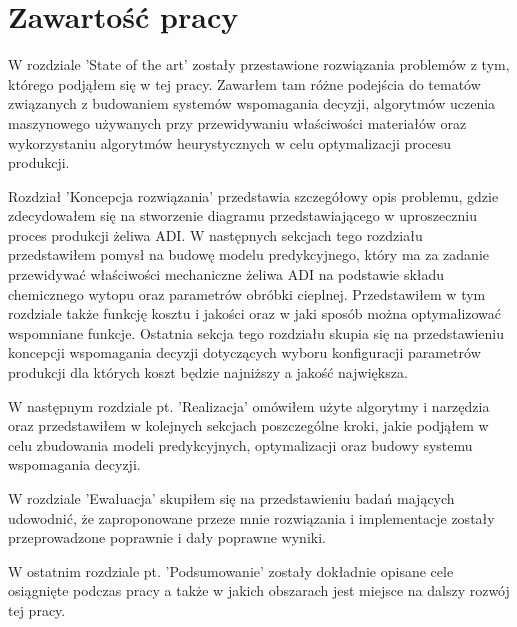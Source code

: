 \section{Zawartość pracy}
W rozdziale 'State of the art' zostały przestawione rozwiązania problemów z tym, którego podjąłem się w tej pracy. Zawarłem tam różne podejścia do tematów związanych z budowaniem systemów wspomagania decyzji, algorytmów uczenia maszynowego używanych przy przewidywaniu właściwości materiałów oraz wykorzystaniu algorytmów heurystycznych w celu optymalizacji procesu produkcji.

Rozdział 'Koncepcja rozwiązania' przedstawia szczegółowy opis problemu, gdzie zdecydowałem się na stworzenie diagramu przedstawiającego w uproszeczniu proces produkcji żeliwa ADI. W następnych sekcjach tego rozdziału przedstawiłem pomysł na budowę modelu predykcyjnego, który ma za zadanie przewidywać właściwości mechaniczne żeliwa ADI na podstawie składu chemicznego wytopu oraz parametrów obróbki cieplnej. Przedstawiłem w tym rozdziale także funkcję kosztu i jakości oraz w jaki sposób można optymalizować wspomniane funkcje. Ostatnia sekcja tego rozdziału skupia się na przedstawieniu koncepcji wspomagania decyzji dotyczących wyboru konfiguracji parametrów produkcji dla których koszt będzie najniższy a jakość największa.

W następnym rozdziale pt. 'Realizacja' omówiłem użyte algorytmy i narzędzia oraz przedstawiłem w kolejnych sekcjach poszczególne kroki, jakie podjąłem w celu zbudowania modeli predykcyjnych, optymalizacji oraz budowy systemu wspomagania decyzji.

W rozdziale 'Ewaluacja' skupiłem się na przedstawieniu badań mających udowodnić, że zaproponowane przeze mnie rozwiązania i implementacje zostały przeprowadzone poprawnie i dały poprawne wyniki.

W ostatnim rozdziale pt. 'Podsumowanie' zostały dokładnie opisane cele osiągnięte podczas pracy a także w jakich obszarach jest miejsce na dalszy rozwój tej pracy.
